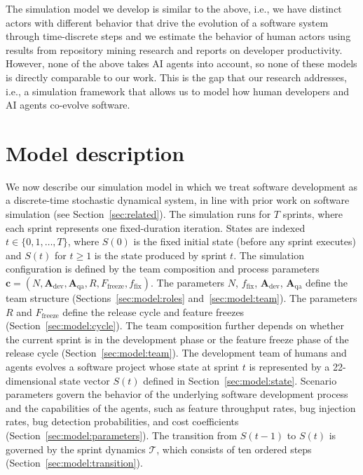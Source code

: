 \documentclass[smallextended]{svjour3}       %
\begin{document}
The simulation model we develop is similar to the above, i.e., we have distinct actors with different behavior that drive the evolution of a software system through time-discrete steps and we estimate the behavior of human actors using results from repository mining research and reports on developer productivity. However, none of the above takes AI agents into account, so none of these models is directly comparable to our work. This is the gap that our research addresses, i.e., a simulation framework that allows us to model how human developers and AI agents co-evolve software. 


\section{Model description}
\label{sec:model}

We now describe our simulation model in which we treat software development as a discrete-time stochastic dynamical system, in line with prior work on software simulation (see Section~\ref{sec:related}). The simulation runs for $T$ sprints, where each sprint represents one
fixed-duration iteration. States are indexed $t \in \{0, 1, \ldots, T\}$,
where $S(0)$ is the fixed initial state (before any sprint executes) and
$S(t)$ for $t \geq 1$ is the state produced by sprint $t$. The simulation configuration is defined by the team composition and process parameters 
$\mathbf{c} = (N, \mathbf{A}_\mathrm{dev}, \mathbf{A}_\mathrm{qa}, R, F_\mathrm{freeze}, f_\mathrm{fix})$. The parameters
$N$, $f_\mathrm{fix}$, $\mathbf{A}_\mathrm{dev}$, $\mathbf{A}_\mathrm{qa}$ define the team structure (Sections~\ref{sec:model:roles} and~\ref{sec:model:team}). The parameters $R$ and $F_\mathrm{freeze}$ define the release cycle and feature freezes (Section~\ref{sec:model:cycle}). The team composition further depends on whether the current sprint is in the development phase or the feature freeze phase of the release cycle (Section~\ref{sec:model:team}). The development team of humans and agents evolves a software project whose state at sprint $t$ is represented by a 22-dimensional state vector $S(t)$ defined in Section~\ref{sec:model:state}. Scenario parameters govern the behavior of the underlying software development process and the capabilities of the agents, such as feature throughput rates, bug injection rates, bug detection probabilities, and cost coefficients (Section~\ref{sec:model:parameters}). The transition from $S(t-1)$ to $S(t)$ is governed by the sprint dynamics $\mathcal{T}$, which consists of ten ordered steps (Section~\ref{sec:model:transition}).
\end{document}
